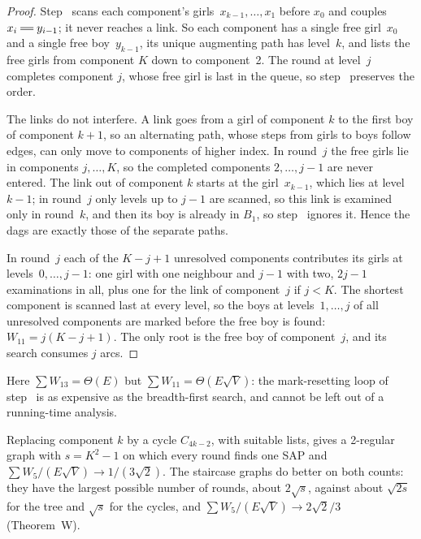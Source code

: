 \begin{proof}
Step~ scans each component's girls~$x_{k-1},\ldots,x_1$ before $x_0$ and
couples $x_i\db y_{i-1}$; it never reaches a link. So each component has a
single free girl~$x_0$ and a single free boy~$y_{k-1}$, its unique augmenting
path has level~$k$, and  lists the free girls from component $K$
down to component~2. The round at level~$j$ completes component $j$, whose
free girl is last in the queue, so step~ preserves the order.

The links do not interfere. A link goes from a girl of component $k$ to
the first boy of component $k+1$, so an alternating path, whose steps from
girls to boys follow edges, can only move to components of higher index.
In round~$j$ the free girls lie in components $j,\ldots,K$, so the
completed components $2,\ldots,j-1$ are never entered. The link out of
component $k$ starts at the girl~$x_{k-1}$, which lies at level~$k-1$; in
round~$j$ only levels up to $j-1$ are scanned, so this link is examined
only in round~$k$, and then its boy is already in $B_1$, so step~
ignores it. Hence the dags are exactly those of the separate paths.

In round~$j$ each of the $K-j+1$ unresolved components contributes its
girls at levels~$0,\ldots,j-1$: one girl with one neighbour and $j-1$ with
two, $2j-1$ examinations in all, plus one for the link of component~$j$
if $j<K$. The shortest component is scanned last at every level, so the
boys at levels~$1,\ldots,j$ of all unresolved components are marked
before the free boy is found: $W_{11}=j(K-j+1)$. The only root is the free
boy of component~$j$, and its search consumes $j$ arcs.
\end{proof}

Here $\sum W_{13}=\Theta(E)$ but $\sum W_{11}=\Theta(E\sqrt V)$: the mark-resetting loop of
step~ is as expensive as the breadth-first search, and cannot be
left out of a running-time analysis.

\begin{remark}
Replacing component $k$ by a cycle $C_{4k-2}$, with suitable lists, gives a
2-regular graph with $s=K^2-1$ on which every round finds one SAP and
$\sum W_5/(E\sqrt V)\to1/(3\sqrt2)$. The staircase graphs do better on
both counts: they have the largest possible number of rounds, about
$2\sqrt s$, against about $\sqrt{2s}$ for the tree and $\sqrt s$ for the
cycles, and $\sum W_5/(E\sqrt V)\to2\sqrt2/3$
(Theorem~W).
\end{remark}
